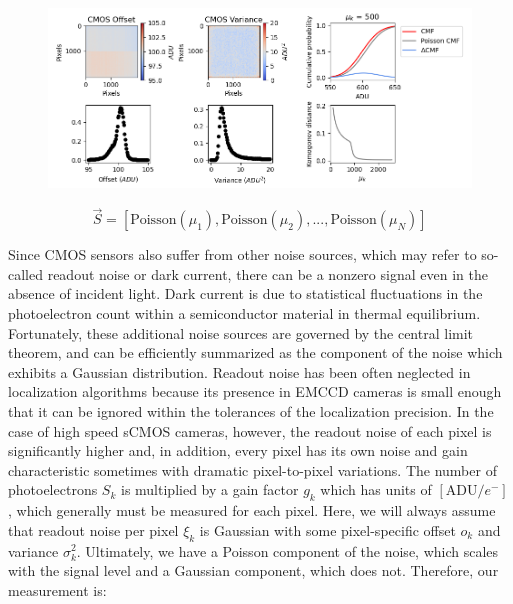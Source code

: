 \documentclass{ucetd}
\begin{document}
\begin{figure}
\begin{center}
\includegraphics[width=16cm]{Noise.png}
\end{center}
\end{figure}




\begin{equation}
\vec{S} = \left[\mathrm{Poisson}(\mu_{1}), \mathrm{Poisson}(\mu_{2}), ..., \mathrm{Poisson}(\mu_{N})\right]
\end{equation}

Since CMOS sensors also suffer from other noise sources, which may refer to so-called readout noise or dark current, there can be a nonzero signal even in the absence of incident light. Dark current is due to statistical fluctuations in the photoelectron count within a semiconductor material in thermal equilibrium. Fortunately, these additional noise sources are governed by the central limit theorem, and can be efficiently summarized as the component of the noise which exhibits a Gaussian distribution. Readout noise has been often neglected in localization algorithms because its presence in EMCCD cameras is small enough that it can be ignored within the tolerances of the localization precision. In the case of high speed sCMOS cameras, however, the readout noise of each pixel is significantly higher and, in addition, every pixel has its own noise and gain characteristic sometimes with dramatic pixel-to-pixel variations. The number of photoelectrons $S_{k}$ is  multiplied by a gain factor $g_{k}$ which has units of $[\mathrm{ADU}/e^{-}]$, which generally must be measured for each pixel. Here, we will always assume that readout noise per pixel $\xi_{k}$ is Gaussian with some pixel-specific offset $o_{k}$ and variance $\sigma_{k}^{2}$. Ultimately, we have a Poisson component of the noise, which scales with the signal level and a Gaussian component, which does not. Therefore, our measurement is: 
\end{document}
